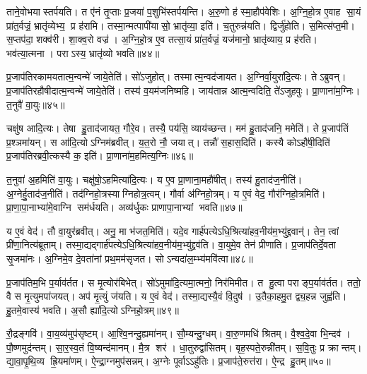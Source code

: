 ताने॒वोभयास्तर्पयति।
त ए॑नं तृ॒प्ताः प्र॒जया॑ प॒शुभि॑स्तर्पयन्ति।
अ॒रु॒णो ह॑ स्मा॒हौप॑वेशिः।
अ॒ग्नि॒हो॒त्र ए॒वाह सा॒यं प्रा॑त॒र्वज्रं॒ भ्रातृ॑व्येभ्य॒ प्र ह॑रामि।
तस्मा॒न्मत्पापी॑यासो॒ भ्रातृ॑व्या॒ इति॑।
च॒तुरुन्न॑यति।
द्विर्जु॑होति।
स॒मित्स॑प्त॒मी।
स॒प्तप॑दा॒ शक्व॑री।
शा॒क्व॒रो वज्र॑।
अ॒ग्नि॒हो॒त्र ए॒व तत्सा॒यं प्रा॑त॒र्वज्रं॒ यज॑मानो॒ भ्रातृ॑व्याय॒ प्र ह॑रति।
भव॑त्या॒त्मना।
पराऽस्य॒ भ्रातृ॑व्यो भवति॥४४॥

प्र॒जाप॑तिरकामयतात्म॒न्वन्मे॑ जाये॒तेति॑।
सो॑ऽजुहोत्।
तस्मात्म॒न्वद॑जायत।
अ॒ग्निर्वा॒युरा॑दि॒त्यः।
तेऽब्रुवन्।
प्र॒जाप॑तिरहौषीदात्म॒न्वन्मे॑ जाये॒तेति॑।
तस्य॑ व॒यम॑जनिष्महि।
जाय॑तान्न आत्म॒न्वदिति॒ ते॑ऽजुहवुः।
प्रा॒णाना॑म॒ग्निः।
त॒नुवै॑ वा॒युः॥४५॥

चक्षु॑ष आदि॒त्यः।
तेषा हु॒ताद॑जायत॒ गौरे॒व।
तस्यै॒ पय॑सि॒ व्याय॑च्छन्त।
मम॑ हु॒ताद॑जनि॒ ममेति॑।
ते प्र॒जाप॑तिं प्र॒श्ञमा॑यन्।
स आ॑दि॒त्योऽग्निम॑ब्रवीत्।
य॒त॒रो नौ॒ जयात्।
तन्नौ॑ स॒हास॒दिति॑।
कस्यै कोऽहौ॑षी॒दिति॑ प्र॒जाप॑तिरब्रवी॒त्कस्यै क॒ इति॑।
प्रा॒णाना॑म॒हमित्य॒ग्निः॥४६॥

त॒नुवा॑ अ॒हमिति॑ वा॒युः।
चक्षु॑षो॒ऽहमित्या॑दि॒त्यः।
य ए॒व प्रा॒णाना॒महौ॑षीत्।
तस्य॑ हु॒ताद॑ज॒नीति॑।
अ॒ग्नेर्\mbox{}हु॒ताद॑ज॒नीति॑।
तद॑ग्निहो॒त्रस्याग्निहोत्र॒त्वम्।
गौर्वा अ॑ग्निहो॒त्रम्।
य ए॒वं वेद॒ गौर॑ग्निहो॒त्रमिति॑।
प्रा॒णा॒पा॒नाभ्या॑मे॒वाग्नि सम॑र्धयति।
अव्य॑र्धुकः प्राणापा॒नाभ्यां भवति॥४७॥

य ए॒वं वेद॑।
तौ वा॒युर॑ब्रवीत्।
अनु॒ मा भ॑जत॒मिति॑।
यदे॒व गार्\mbox{}ह॑पत्येऽधि॒श्रित्या॑हव॒नीय॑म॒भ्यु॑द्द्रवान्॑।
तेन॒ त्वां प्री॑णा॒नित्य॑ब्रूताम्।
तस्मा॒द्यद्गार्\mbox{}ह॑पत्येऽधि॒श्रित्या॑हव॒नीय॑\-म॒भ्यु॑द्द्रव॑ति।
वा॒युमे॒व तेन॑ प्रीणाति।
प्र॒जाप॑तिर्दे॒वता सृ॒जमा॑नः।
अ॒ग्निमे॒व दे॒वता॑नां प्रथ॒मम॑सृजत।
सोऽन्यदा॑\-ल॒म्भ्य॑मवि॑त्वा॥४८॥

प्र॒जाप॑तिम॒भि प॒र्याव॑र्तत।
स मृ॒त्योर॑बिभेत्।
सो॑ऽमुमा॑दि॒त्य\-मा॒त्मनो॒ निर॑मिमीत।
त हु॒त्वा पराङ्प॒र्याव॑र्तत।
ततो॒ वै स मृ॒त्युमपा॑जयत्।
अप॑ मृ॒त्युं ज॑यति।
य ए॒वं वेद॑।
तस्मा॒द्यस्यै॒वं वि॒दुष॑।
उ॒तैका॒हमु॒त द्व्य॒हन्न जुह्व॑ति।
हु॒तमे॒वास्य॑ भवति।
अ॒सौ ह्या॑दि॒त्योऽग्निहो॒त्रम्॥४९॥\anuvakamend[त॒नुवै॑ वा॒युर॒ग्निर्भ॑व॒त्यवि॑त्वा भव॒त्येकं च]

रौ॒द्रङ्गवि॑।
वा॒य॒व्य॑मुप॑सृष्टम्।
आ॒श्वि॒नन्दु॒ह्यमा॑नम्।
सौ॒म्यन्दु॒ग्धम्।
वा॒रु॒णमधि॑ श्रितम्।
वै॒श्व॒दे॒वा भि॒न्दव॑।
पौ॒ष्णमुद॑न्तम्।
सा॒र॒स्व॒तं वि॒ष्यन्द॑मानम्।
मै॒त्र शर॑।
धा॒तुरुद्वा॑सितम्।
बृह॒स्पते॒रुन्नी॑तम्।
स॒वि॒तुः प्र क्रान्तम्।
द्या॒वा॒पृ॒थि॒व्य ह्रि॒यमा॑णम्।
ऐ॒न्द्रा॒ग्नमुप॑सन्नम्।
अ॒ग्नेः पूर्वाऽऽहु॑तिः।
प्र॒जाप॑ते॒रुत्त॑रा।
ऐ॒न्द्र हु॒तम्॥५०॥\anuvakamend[उद्वा॑सित स॒प्त च॑]


